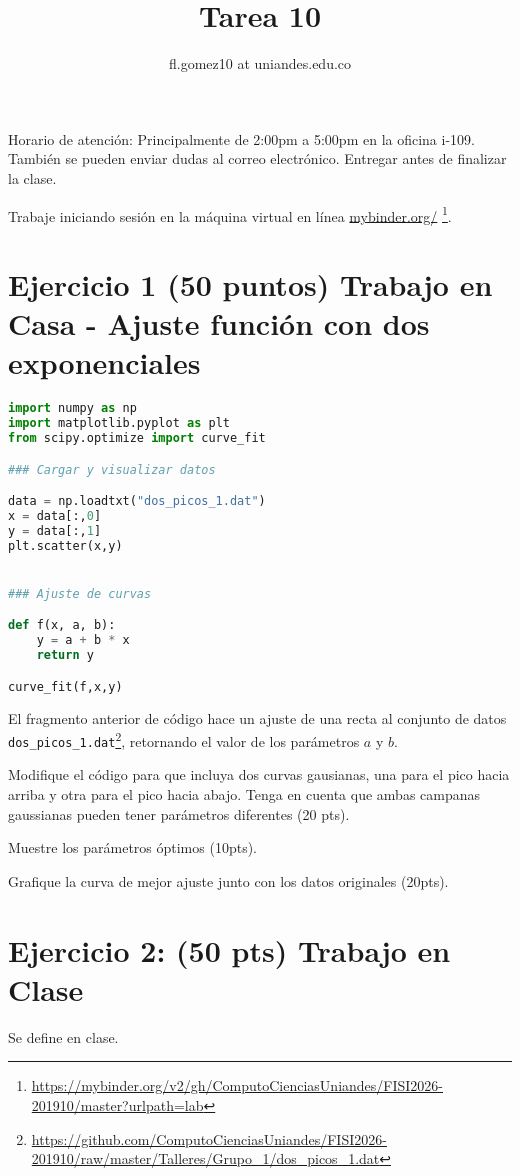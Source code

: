 \documentclass{article}
\title{Tarea 10}
\author{fl.gomez10 at uniandes.edu.co}
\begin{document}
\maketitle

Horario de atención: Principalmente de 2:00pm a 5:00pm en la oficina i-109.
También se pueden enviar dudas al correo electrónico.
Entregar antes de finalizar la clase. 

Trabaje iniciando  sesión en la máquina virtual en línea
\href{https://mybinder.org/v2/gh/ComputoCienciasUniandes/FISI2026-201910/master?urlpath=lab}{mybinder.org/}
\footnote{\url{https://mybinder.org/v2/gh/ComputoCienciasUniandes/FISI2026-201910/master?urlpath=lab}}. 


\section{Ejercicio 1 (50 puntos) Trabajo en Casa - Ajuste función con dos exponenciales}

\begin{lstlisting}[language=Python]
import numpy as np
import matplotlib.pyplot as plt
from scipy.optimize import curve_fit

### Cargar y visualizar datos

data = np.loadtxt("dos_picos_1.dat")
x = data[:,0]
y = data[:,1]
plt.scatter(x,y)


### Ajuste de curvas

def f(x, a, b):
    y = a + b * x
    return y

curve_fit(f,x,y)
\end{lstlisting}

El fragmento anterior de código hace un ajuste de una recta al conjunto de datos
\texttt{dos\_picos\_1.dat}\footnote{\url{https://github.com/ComputoCienciasUniandes/FISI2026-201910/raw/master/Talleres/Grupo_1/dos_picos_1.dat}}, retornando el valor de los parámetros $a$ y $b$.

Modifique el código para que incluya dos curvas gausianas, una
para el pico hacia arriba y otra para el pico hacia abajo.
Tenga en cuenta que ambas campanas gaussianas pueden tener
parámetros diferentes (20 pts).

Muestre los parámetros óptimos (10pts).

Grafique la curva de mejor ajuste junto con los datos originales (20pts).

\section{Ejercicio 2: (50 pts) Trabajo en Clase}

Se define en clase.
\end{document}
